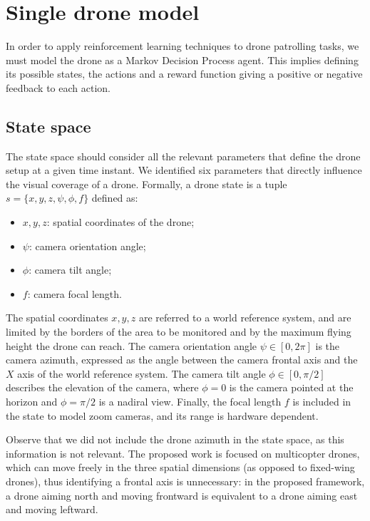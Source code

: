 \documentclass{article}
\begin{document}
\section{Single drone model}
\label{sec:singledronemodel}
In order to apply reinforcement learning techniques to drone patrolling tasks, we must model the drone as a Markov Decision Process agent. This implies defining its possible states, the actions and a reward function giving a positive or negative feedback to each action.

\subsection{State space}
\label{subsec:statespace}
The state space should consider all the relevant parameters that define the drone setup at a given time instant. We identified six parameters that directly influence the visual coverage of a drone. Formally, a drone state is a tuple $s=\{x,y,z,\psi,\phi,f\}$ defined as:
\begin{itemize}
	\item $x, y, z$: spatial coordinates of the drone;
	\item $\psi$: camera orientation angle;
	\item $\phi$: camera tilt angle;
	\item $f$: camera focal length.
\end{itemize}

The spatial coordinates $x,y,z$ are referred to a world reference system, and are limited by the borders of the area to be monitored and by the maximum flying height the drone can reach. The camera orientation angle $\psi\in[0,2\pi]$ is the camera azimuth, expressed as the angle between the camera frontal axis and the $X$ axis of the world reference system. The camera tilt angle $\phi\in [0,\pi/2]$ describes the elevation of the camera, where $\phi=0$ is the camera pointed at the horizon and $\phi=\pi/2$ is a nadiral view. Finally, the focal length $f$ is included in the state  to model zoom cameras, and its range is hardware dependent. 

Observe that we did not include the drone azimuth in the state space, as this information is not relevant. The proposed work is focused on multicopter drones, which can move freely in the three spatial dimensions (as opposed to fixed-wing drones), thus identifying a frontal axis is unnecessary: in the proposed framework, a drone aiming north and moving frontward is equivalent to a drone aiming east and moving leftward.
\end{document}
